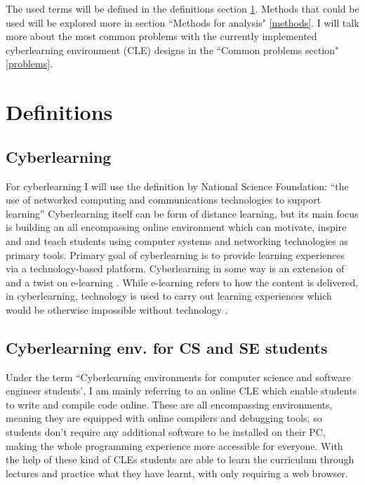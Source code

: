 \documentclass[10pt,english,a4paper]{article} %
\begin{document}
The used terms will be defined in the definitions section \ref{definitions}.
Methods that could be used will be explored more in section ``Methods for analysis" \ref{methods}.
I will talk more about the most common problems with the currently implemented cyberlearning environment (CLE)
designs in the ``Common problems section" \ref{problems}.


\section{Definitions}\label{definitions}

\subsection{Cyberlearning}
For cyberlearning I will use the definition by National Science Foundation: 
``the use of networked computing and communications technologies to support learning” \cite{borgman_2017_fostering} 
Cyberlearning itself can be form of distance learning, but its main focus is building an all 
encompassing online environment which can motivate, inspire and and teach students using 
computer systems and networking technologies as primary tools. \cite{ui/ux}
Primary goal of cyberlearning is to provide learning experiences via a technology-based platform. 
Cyberlearning in some way is an extension of and a twist on e-learning \cite{lynch_2020_cyberlearning}.
While e-learning refers to how the content is delivered, in cyberlearning, technology
is used to carry out learning experiences which would be otherwise impossible without technology \cite{lynch_2020_cyberlearning}.

\subsection{Cyberlearning env. for CS and SE students}
Under the term ``Cyberlearning environments for computer science and software engineer students', I am mainly
referring to an online CLE which enable students to write and compile code online. These are all encompassing
environments, meaning they are equipped with 
online compilers and debugging tools, so students don't require any additional software to be installed on their PC, making
the whole programming experience more accessible for everyone.
With the help of these kind of CLEs students are able to learn the curriculum through lectures and practice
what they have learnt, with only requiring a web browser.
\end{document}
